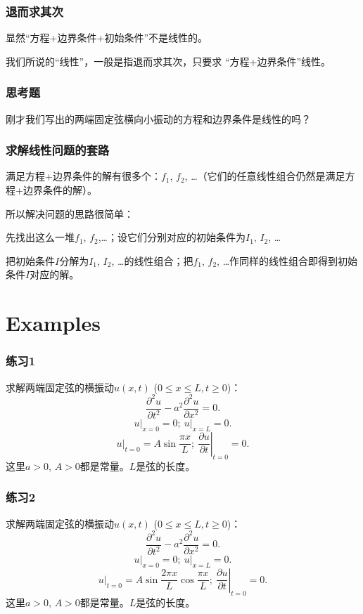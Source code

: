 \documentclass[CJK]{beamer}
\begin{document}
\begin{frame}
  \frametitle{退而求其次}
显然“方程+边界条件+初始条件”不是线性的。

\skipline

我们所说的“线性”，一般是指退而求其次，只要求 {\blue “方程+边界条件”线性}。

\end{frame}


\begin{frame}
  \frametitle{思考题}

  刚才我们写出的两端固定弦横向小振动的方程和边界条件是线性的吗？

\end{frame}


\begin{frame}
  \frametitle{求解线性问题的套路}

  满足方程+边界条件的解有很多个：$f_1$, $f_2$, \ldots （它们的任意线性组合仍然是满足方程+边界条件的解）。

  所以解决问题的思路很简单：

  \bitem
\item{先找出这么一堆$f_1$, $f_2$,\ldots；设它们分别对应的初始条件为$I_1$, $I_2$, \ldots}
\item{把初始条件$I$分解为$I_1$, $I_2$, \ldots 的线性组合；把$f_1$, $f_2$, \ldots 作同样的线性组合即得到初始条件$I$对应的解。}
  \eitem
  
\end{frame}

\section{Examples}

\begin{frame}
  \frametitle{练习1}
  求解两端固定弦的横振动$u(x, t)$ ($0\le x\le L, t\ge 0$)：
  $$\frac{\partial^2u}{\partial t^2} - a^2\frac{\partial^2u}{\partial x^2} = 0 .$$
  $$ \left.u\right\vert_{x=0} = 0;\ \left.u\right\vert_{x=L} = 0.$$
  $$ \left.u\right\vert_{t=0} = A\sin\frac{\pi x}{L};\ \left.\frac{\partial u}{\partial t}\right\vert_{t=0} = 0.$$
  这里$a>0$, $A>0$都是常量。$L$是弦的长度。
\end{frame}



\begin{frame}
  \frametitle{练习2}
  求解两端固定弦的横振动$u(x, t)$ ($0\le x\le L, t\ge 0$)：
  $$\frac{\partial^2u}{\partial t^2} - a^2\frac{\partial^2u}{\partial x^2} = 0 .$$
  $$ \left.u\right\vert_{x=0} = 0;\ \left.u\right\vert_{x=L} = 0.$$
  $$ \left.u\right\vert_{t=0} = A\sin\frac{2\pi x}{L}\cos\frac{\pi x}{L};\ \left.\frac{\partial u}{\partial t}\right\vert_{t=0} = 0.$$
  这里$a>0$, $A>0$都是常量。$L$是弦的长度。
\end{frame}
\end{document}
